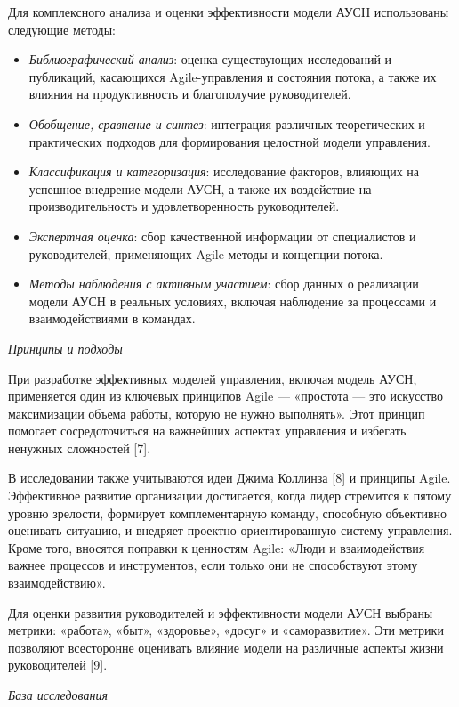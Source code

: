Для комплексного анализа и оценки эффективности модели АУСН использованы
следующие методы:

\begin{itemize}
\item
  \emph{Библиографический анализ}: оценка существующих исследований и
  публикаций, касающихся Agile-управления и состояния потока, а также их
  влияния на продуктивность и благополучие руководителей.
\item
  \emph{Обобщение, сравнение и синтез}: интеграция различных
  теоретических и практических подходов для формирования целостной
  модели управления.
\item
  \emph{Классификация и категоризация}: исследование факторов, влияющих
  на успешное внедрение модели АУСН, а также их воздействие на
  производительность и удовлетворенность руководителей.
\item
  \emph{Экспертная оценка}: сбор качественной информации от специалистов
  и руководителей, применяющих Agile-методы и концепции потока.
\item
  \emph{Методы наблюдения с активным участием}: сбор данных о реализации
  модели АУСН в реальных условиях, включая наблюдение за процессами и
  взаимодействиями в командах.
\end{itemize}

\emph{Принципы и подходы}

При разработке эффективных моделей управления, включая модель АУСН,
применяется один из ключевых принципов Agile --- «простота --- это
искусство максимизации объема работы, которую не нужно выполнять». Этот
принцип помогает сосредоточиться на важнейших аспектах управления и
избегать ненужных сложностей {[}7{]}.

В исследовании также учитываются идеи Джима Коллинза {[}8{]} и принципы
Agile. Эффективное развитие организации достигается, когда лидер
стремится к пятому уровню зрелости, формирует комплементарную команду,
способную объективно оценивать ситуацию, и внедряет
проектно-ориентированную систему управления. Кроме того, вносятся
поправки к ценностям Agile: «Люди и взаимодействия важнее процессов и
инструментов, если только они не способствуют этому взаимодействию».

Для оценки развития руководителей и эффективности модели АУСН выбраны
метрики: «работа», «быт», «здоровье», «досуг» и «саморазвитие». Эти
метрики позволяют всесторонне оценивать влияние модели на различные
аспекты жизни руководителей {[}9{]}.

\emph{База исследования}

